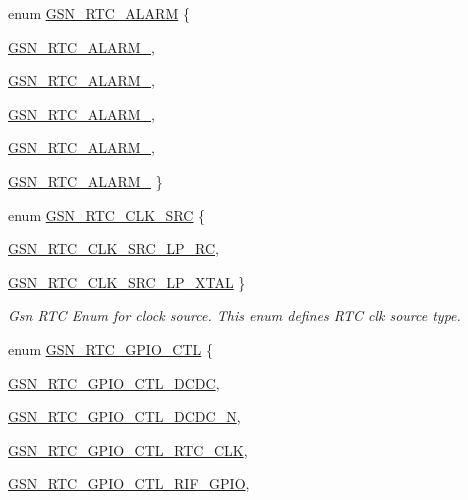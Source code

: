 \begin{DoxyCompactItemize}
\item 
enum \hyperlink{a00582_a7ac2ec492b22971df1e2f294bdb35a06}{GSN\_\-RTC\_\-ALARM} \{ \par
\hyperlink{a00582_a7ac2ec492b22971df1e2f294bdb35a06abecb97663dcbc46a57076ce23a4f92bd}{GSN\_\-RTC\_\-ALARM\_}, 
\par
\hyperlink{a00582_a7ac2ec492b22971df1e2f294bdb35a06adc9593222c178deec345196e2273ee4e}{GSN\_\-RTC\_\-ALARM\_}, 
\par
\hyperlink{a00582_a7ac2ec492b22971df1e2f294bdb35a06af6460e5c96bcf15c981d6ef7db825187}{GSN\_\-RTC\_\-ALARM\_}, 
\par
\hyperlink{a00582_a7ac2ec492b22971df1e2f294bdb35a06a3b72350180c03ce5d7299d0c3d6ab692}{GSN\_\-RTC\_\-ALARM\_}, 
\par
\hyperlink{a00582_a7ac2ec492b22971df1e2f294bdb35a06a58be24ae33a15219d663648ca4372dc9}{GSN\_\-RTC\_\-ALARM\_}
 \}
\item 
enum \hyperlink{a00651_gaace509e7754aacb14b76f77e68fa9b2a}{GSN\_\-RTC\_\-CLK\_\-SRC} \{ \par
\hyperlink{a00651_ggaace509e7754aacb14b76f77e68fa9b2aa103f27c2edcc660a4bd726cfa53df43b}{GSN\_\-RTC\_\-CLK\_\-SRC\_\-LP\_\-RC}, 
\par
\hyperlink{a00651_ggaace509e7754aacb14b76f77e68fa9b2aac0cf76a0773079a58adbc64828e8aa6f}{GSN\_\-RTC\_\-CLK\_\-SRC\_\-LP\_\-XTAL}
 \}
\begin{DoxyCompactList}\small\item\em Gsn RTC Enum for clock source. This enum defines RTC clk source type. \end{DoxyCompactList}\item 
enum \hyperlink{a00651_ga3481de456997229518bb1895981bfd74}{GSN\_\-RTC\_\-GPIO\_\-CTL} \{ \par
\hyperlink{a00651_gga3481de456997229518bb1895981bfd74a087e1ac97a549039bf46b0ca6f7da567}{GSN\_\-RTC\_\-GPIO\_\-CTL\_\-DCDC}, 
\par
\hyperlink{a00651_gga3481de456997229518bb1895981bfd74af5391710c39c3af1ce9ee70bc1a5d9ad}{GSN\_\-RTC\_\-GPIO\_\-CTL\_\-DCDC\_\-N}, 
\par
\hyperlink{a00651_gga3481de456997229518bb1895981bfd74a376a5f6b9f22deac5b1d1b6b19abbe8c}{GSN\_\-RTC\_\-GPIO\_\-CTL\_\-RTC\_\-CLK}, 
\par
\hyperlink{a00651_gga3481de456997229518bb1895981bfd74a8095290c629ab3e4edaaa422706fe324}{GSN\_\-RTC\_\-GPIO\_\-CTL\_\-RIF\_\-GPIO}, 
\par

\end{DoxyCompactItemize}
